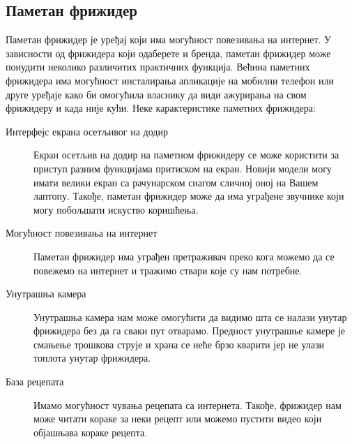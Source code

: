 \documentclass[a4paper]{article}
\begin{document}
\subsection{Паметан фрижидер}
Паметан фрижидер је уређај који има могућност повезивања на интернет. У зависности од фрижидера који одаберете и бренда, паметан фрижидер може понудити
неколико различитих практичних функција. Већина паметних фрижидера има могућност инсталирања апликације на мобилни телефон или друге уређаје како би омогућила
власнику да види ажурирања на свом фрижидеру и када није кући.
\newline\newline Неке карактеристике паметних фрижидера:
\begin{description}
    \item[Интерфејс екрана осетљивог на додир]
    Екран осетљив на додир на паметном фрижидеру се може користити за приступ разним функцијама притиском на екран. Новији модели могу имати велики екран
    са рачунарском снагом сличној оној на Вашем лаптопу. Такође, паметан фрижидер може да има уграђене звучнике који могу побољшати искуство коришћења.
    \item[Могућност повезивања на интернет]
    Паметан фрижидер има уграђен претраживач преко кога можемо да се повежемо на интернет и тражимо ствари које су нам потребне.
    \item[Унутрашња камера]
    Унутрашња камера нам може омогућити да видимо шта се налази унутар фрижидера без да га сваки пут отварамо. Предност унутрашње камере је смањење трошкова
    струје и храна се неће брзо кварити јер не улази топлота унутар фрижидера.
    \item[База рецепата]
    Имамо могућност чувања рецепата са интернета. Такође, фрижидер нам може читати кораке за неки рецепт или можемо пустити видео који објашњава кораке рецепта.
\end{description}
\end{document}
